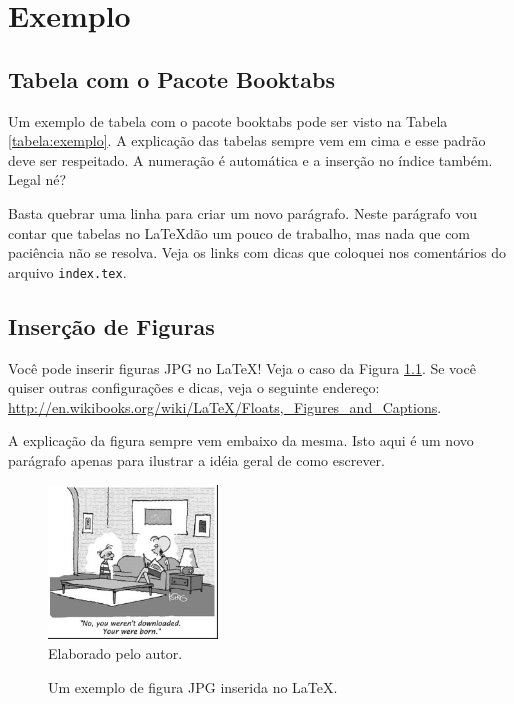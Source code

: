 \chapter{Exemplo}

\section{Tabela com o Pacote Booktabs}

Um exemplo de tabela com o pacote booktabs pode ser visto na Tabela \ref{tabela:exemplo}. A explicação das tabelas sempre vem em cima e esse padrão deve ser respeitado. A numeração é automática e a inserção no índice também. Legal né? \cite{Bennett:QuantumInformationSurvey}

Basta quebrar uma linha para criar um novo parágrafo. Neste parágrafo vou contar que tabelas no \LaTeX dão um pouco de trabalho, mas nada que com paciência não se resolva. Veja os links com dicas que coloquei nos comentários do arquivo \texttt{index.tex}.

\begin{table}[ht!]
\caption{Esta é uma tabela básica em \LaTeX com o pacote booktabs.} \label{tabela:exemplo}
\end{table}



\section{Inserção de Figuras}

Você pode inserir figuras JPG no \LaTeX! Veja o caso da Figura \ref{fig:exemplo}. Se você quiser outras configurações e dicas, veja o seguinte endereço: \url{http://en.wikibooks.org/wiki/LaTeX/Floats,_Figures_and_Captions}.

A explicação da figura sempre vem embaixo da mesma. Isto aqui é um novo parágrafo apenas para ilustrar a idéia geral de como escrever.

\begin{figure}[H]
\centering
\caption{Um exemplo de figura JPG inserida no \LaTeX.} \label{fig:exemplo}
\includegraphics[width=0.4\textwidth]{./img/exemplo.jpg}\\
\small{Elaborado pelo autor.}
\end{figure}

